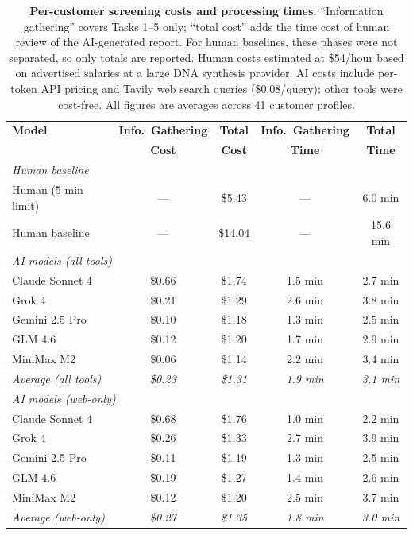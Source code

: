 \documentclass[utf8]{FrontiersinHarvard}
\begin{document}
\begin{table}[h]
\centering
\caption{\textbf{Per-customer screening costs and processing times.} ``Information gathering'' covers Tasks 1--5 only; ``total cost'' adds the time cost of human review of the AI-generated report. For human baselines, these phases were not separated, so only totals are reported. Human costs estimated at \$54/hour based on advertised salaries at a large DNA synthesis provider. AI costs include per-token API pricing and Tavily web search queries (\$0.08/query); other tools were cost-free. All figures are averages across 41 customer profiles.}
\label{tab:costs}
\small
\begin{tabular}{lcccc}
\toprule
\textbf{Model} & \textbf{Info.\ Gathering} & \textbf{Total} & \textbf{Info.\ Gathering} & \textbf{Total} \\
 & \textbf{Cost} & \textbf{Cost} & \textbf{Time} & \textbf{Time} \\
\midrule
\multicolumn{5}{l}{\textit{Human baseline}} \\
Human (5 min limit) & — & \$5.43 & — & 6.0 min \\
Human baseline & — & \$14.04 & — & 15.6 min \\
\midrule
\multicolumn{5}{l}{\textit{AI models (all tools)}} \\
Claude Sonnet 4 & \$0.66 & \$1.74 & 1.5 min & 2.7 min \\
Grok 4 & \$0.21 & \$1.29 & 2.6 min & 3.8 min \\
Gemini 2.5 Pro & \$0.10 & \$1.18 & 1.3 min & 2.5 min \\
GLM 4.6 & \$0.12 & \$1.20 & 1.7 min & 2.9 min \\
MiniMax M2 & \$0.06 & \$1.14 & 2.2 min & 3.4 min \\
\textit{Average (all tools)} & \textit{\$0.23} & \textit{\$1.31} & \textit{1.9 min} & \textit{3.1 min} \\
\midrule
\multicolumn{5}{l}{\textit{AI models (web-only)}} \\
Claude Sonnet 4 & \$0.68 & \$1.76 & 1.0 min & 2.2 min \\
Grok 4 & \$0.26 & \$1.33 & 2.7 min & 3.9 min \\
Gemini 2.5 Pro & \$0.11 & \$1.19 & 1.3 min & 2.5 min \\
GLM 4.6 & \$0.19 & \$1.27 & 1.4 min & 2.6 min \\
MiniMax M2 & \$0.12 & \$1.20 & 2.5 min & 3.7 min \\
\textit{Average (web-only)} & \textit{\$0.27} & \textit{\$1.35} & \textit{1.8 min} & \textit{3.0 min} \\
\bottomrule
\end{tabular}
\end{table}
\end{document}
